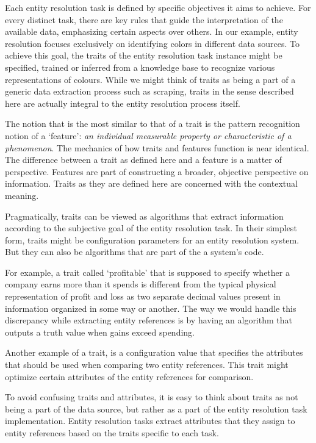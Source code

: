 \documentclass[journal]{IEEEtran}
\begin{document}
    Each entity resolution task is defined by specific objectives it aims to
    achieve.
    For every distinct task, there are key rules that guide the interpretation
    of the available data, emphasizing certain aspects over others.
    In our example, entity resolution focuses exclusively on identifying colors
    in different data sources.
    To achieve this goal, the traits of the entity resolution task instance
    might be specified, trained or inferred from a knowledge base to recognize
    various representations of colours.
    While we might think of traits as being a part of a generic data extraction
    process such as scraping, traits in the sense described here are actually
    integral to the entity resolution process itself.
    
    The notion that is the most similar to that of a trait is the pattern
    recognition notion of a `feature':
    \textit{an individual measurable property or characteristic of a
    phenomenon}\cite{bishop2006pattern}.
    The mechanics of how traits and features function is near identical.
    The difference between a trait as defined here and a feature is a matter of
    perspective.
    Features are part of constructing a broader, objective perspective on
    information.
    Traits as they are defined here are concerned with the contextual meaning.
    
    Pragmatically, traits can be viewed as algorithms that extract information
    according to the subjective goal of the entity resolution task.
    In their simplest form, traits might be configuration parameters for an
    entity resolution system.
    But they can also be algorithms that are part of the a system's code.

    For example, a trait called `profitable' that is supposed to specify whether
    a company earns more than it spends is different from the typical physical
    representation of profit and loss as two separate decimal values present
    in information organized in some way or another.
    The way we would handle this discrepancy while extracting entity references
    is by having an algorithm that outputs a truth value when gains exceed
    spending.

    Another example of a trait, is a configuration value that specifies the
    attributes that should be used when comparing two entity references.
    This trait might optimize certain attributes of the entity references for
    comparison.
    
    To avoid confusing traits and attributes, it is easy to think about traits
    as not being a part of the data source, but rather as a part of the entity
    resolution task implementation.
    Entity resolution tasks extract attributes that they assign to entity
    references based on the traits specific to each task.
\end{document}
